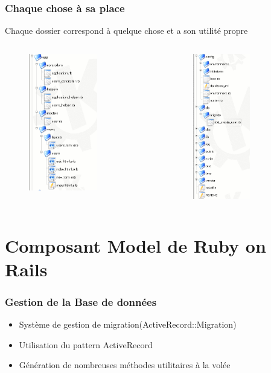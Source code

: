 \documentclass{beamer}
\begin{document}
\begin{frame}
    \frametitle{Chaque chose à sa place}
    Chaque dossier correspond à quelque chose et a son utilité
            propre
    \begin{columns}
        \begin{column}[l]{4cm}
            \begin{figure}
                \includegraphics[width=30mm]{FS_1.png}
            \end{figure}
        \end{column}
        \begin{column}[r]{4cm}
            \begin{figure}
                \includegraphics[width=25mm]{FS_2.png}
            \end{figure}
        \end{column}
    \end{columns}
\end{frame}

\section{Composant Model de Ruby on Rails}

\begin{frame}
    \frametitle{Gestion de la Base de données}
    \begin{itemize}
        \item Système de gestion de migration(ActiveRecord::Migration)
        \item Utilisation du pattern ActiveRecord
        \item Génération de nombreuses méthodes utilitaires à la volée
    \end{itemize}
\end{frame}
\end{document}
